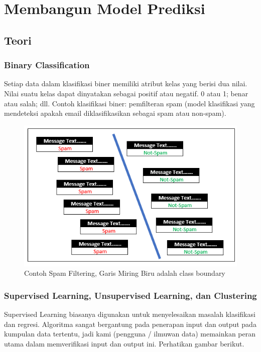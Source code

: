 \chapter{Membangun Model Prediksi}
\section{Teori}

\subsection{Binary Classification}

\par Setiap data dalam klasifikasi biner memiliki atribut kelas yang berisi dua nilai. Nilai suatu kelas dapat dinyatakan sebagai positif atau negatif. 0 atau 1; benar atau salah; dll. Contoh klasifikasi biner: pemfilteran spam (model klasifikasi yang mendeteksi apakah email diklasifikasikan sebagai spam atau non-spam).\cite{binary}

\begin{figure}[H]
    \centering
    \includegraphics[width=12cm]{figures/chapter2/1.png}
    \caption{Contoh Spam Filtering, Garis Miring Biru adalah class boundary}
\end{figure}

\subsection{Supervised Learning, Unsupervised Learning, dan Clustering}

\par Supervised Learning biasanya digunakan untuk menyelesaikan masalah klasifikasi dan regresi. Algoritma sangat bergantung pada penerapan input dan output pada kumpulan data tertentu, jadi kami (pengguna / ilmuwan data) memainkan peran utama dalam memverifikasi input dan output ini. Perhatikan gambar berikut.

